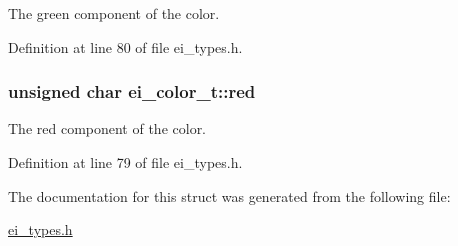 The green component of the color. 



Definition at line 80 of file ei\+\_\+types.\+h.

\hypertarget{structei__color__t_a9adf283c79176b3426ac63784f0bc17b}{
\subsubsection[{red}]{\setlength{\rightskip}{0pt plus 5cm}unsigned char ei\+\_\+color\+\_\+t\+::red}}\label{structei__color__t_a9adf283c79176b3426ac63784f0bc17b}


The red component of the color. 



Definition at line 79 of file ei\+\_\+types.\+h.



The documentation for this struct was generated from the following file\+:\begin{DoxyCompactItemize}
\item 
\hyperlink{ei__types_8h}{ei\+\_\+types.\+h}\end{DoxyCompactItemize}

